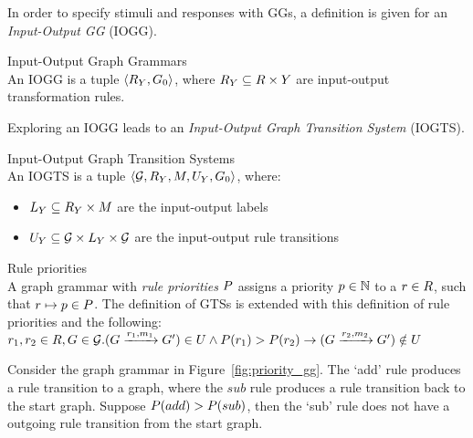 In order to specify stimuli and responses with GGs, a definition is given for an \textit{Input-Output GG} (IOGG).
\vspace{10px}
\begin{definition} Input-Output Graph Grammars \\
An IOGG is a tuple $\langle R_{Y}, G_0\rangle$, where $R_{Y} \subseteq R \times Y$ are input-output transformation rules.
\end{definition}
\vspace{10px}

Exploring an IOGG leads to an \textit{Input-Output Graph Transition System} (IOGTS).
\vspace{10px}
\begin{definition} Input-Output Graph Transition Systems \\
An IOGTS is a tuple  $\langle \mathcal{G}, R_{Y}, M, U_{Y}, G_0\rangle$, where:
\begin{itemize}
\item {}$L_{Y} \subseteq R_{Y} \times M$ are the input-output labels
\item {}$U_{Y} \subseteq \mathcal{G} \times L_{Y} \times \mathcal{G}$ are the input-output rule transitions
\end{itemize}
\end{definition}

\vspace{10px}
\begin{definition} Rule priorities \\
A graph grammar with \textit{rule priorities} $P$ assigns a priority $p\in\mathbb{N}$ to a $r \in R$, such that ${r \mapsto p}\in P$. The definition of GTSs is extended with this definition of rule priorities and the following:\\
\vspace{5px}
$r_1, r_2\in R, G \in \mathcal{G} . (G \xrightarrow{r_1, m_1}G') \in U \land P(r_1) > P(r_2) \rightarrow (G \xrightarrow{r_2, m_2}G') \notin U$\\
\end{definition}
\vspace{10px}
Consider the graph grammar in Figure~\ref{fig:priority_gg}. The `add' rule produces a rule transition to a graph, where the $sub$ rule produces a rule transition back to the start graph. Suppose $P(add) > P(sub)$, then the `sub' rule does not have a outgoing rule transition from the start graph.

